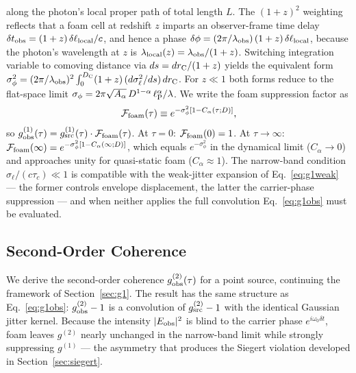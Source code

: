 \documentclass[aps,prd,onecolumn,amsmath,amssymb]{revtex4-2}
\begin{document}
along the photon's local proper path of total length $L$. The $(1+z)^2$
weighting reflects that a foam cell at redshift $z$ imparts an observer-frame
time delay $\delta t_{\rm obs} = (1+z)\,\delta\ell_{\rm local}/c$, and hence
a phase $\delta\phi = (2\pi/\lambda_{\rm obs})\,(1+z)\,\delta\ell_{\rm local}$,
because the photon's wavelength at $z$ is
$\lambda_{\rm local}(z) = \lambda_{\rm obs}/(1+z)$.
Switching integration variable to comoving distance via
$ds = dr_{\rm C}/(1+z)$ yields the equivalent form
$\sigma_\phi^2 = (2\pi/\lambda_{\rm obs})^2 \int_0^{D_{\rm C}}
(1+z)\,(d\sigma_\ell^2/ds)\,dr_{\rm C}$.
For $z \ll 1$ both forms reduce to the flat-space limit
$\sigma_\phi = 2\pi\sqrt{A_\alpha}\,D^{1-\alpha}\,\ell_{\rm P}^\alpha/\lambda$.
We write the foam suppression factor as
\begin{equation}
  \mathcal{F}_{\rm foam}(\tau) \equiv e^{-\sigma_\phi^2[1-C_\alpha(\tau;D)]},
  \label{eq:Ffoam}
\end{equation}
so $g^{(1)}_{\rm obs}(\tau) = g^{(1)}_{\rm src}(\tau)\cdot\mathcal{F}_{\rm foam}(\tau)$.
At $\tau=0$: $\mathcal{F}_{\rm foam}(0) = 1$.
At $\tau\to\infty$: $\mathcal{F}_{\rm foam}(\infty) = e^{-\sigma_\phi^2[1-C_\alpha(\infty;D)]}$,
which equals $e^{-\sigma_\phi^2}$ in the dynamical limit ($C_\alpha\to 0$)
and approaches unity for quasi-static foam ($C_\alpha\approx 1$).
The narrow-band condition $\sigma_\ell/(c\tau_c)\ll 1$ is compatible with
the weak-jitter expansion of Eq.~\eqref{eq:g1weak} --- the former controls
envelope displacement, the latter the carrier-phase suppression --- and
when neither applies the full convolution Eq.~\eqref{eq:g1obs} must be
evaluated.

\subsection{Second-Order Coherence}
\label{sec:g2}
We derive the second-order coherence $g^{(2)}_{\rm obs}(\tau)$ for a point source,
continuing the framework of Section~\ref{sec:g1}.
The result has the same structure as Eq.~\eqref{eq:g1obs}: $g^{(2)}_{\rm obs}-1$
is a convolution of $g^{(2)}_{\rm src}-1$ with the identical Gaussian jitter kernel.
Because the intensity $|E_{\rm obs}|^2$ is blind to the carrier phase
$e^{i\omega_0\delta t}$, foam leaves $g^{(2)}$ nearly unchanged in the narrow-band
limit while strongly suppressing $g^{(1)}$ --- the asymmetry that produces the
Siegert violation developed in Section~\ref{sec:siegert}.
\end{document}
